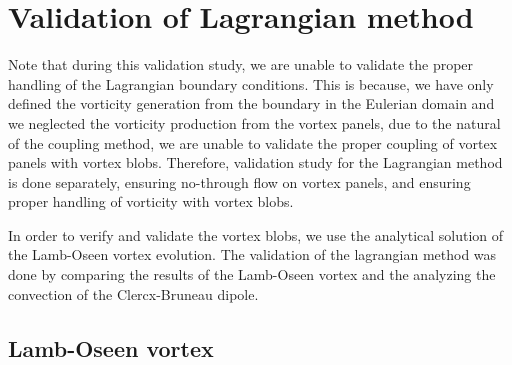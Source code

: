 %
\section{Validation of Lagrangian method}
Note that during this validation study, we are unable to validate the proper handling of the Lagrangian boundary conditions. This is because, we have only defined the vorticity generation from the boundary in the Eulerian domain and we neglected the vorticity production from the vortex panels, due to the natural of the coupling method, we are unable to validate the proper coupling of vortex panels with vortex blobs. Therefore, validation study for the Lagrangian method is done separately, ensuring no-through flow on vortex panels, and ensuring proper handling of vorticity with vortex blobs.

In order to verify and validate the vortex blobs, we use the analytical solution of the Lamb-Oseen vortex evolution. The validation of the lagrangian method was done by comparing the results of the Lamb-Oseen vortex and the analyzing the convection of the Clercx-Bruneau dipole. 

\subsection*{Lamb-Oseen vortex}

